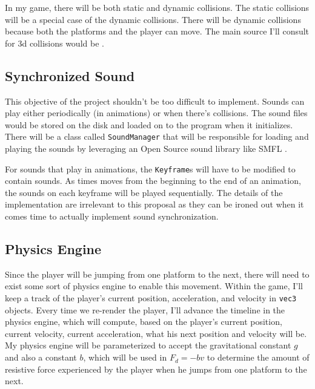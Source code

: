 \documentclass[11pt]{article}
\begin{document}
In my game, there will be both static and dynamic collisions. The static collisions will be a special case of the dynamic collisions. There will be dynamic collisions because both the platforms and the player can move. The main source I'll consult for 3d collisions would be \cite{mdn3dcd}.

\subsection*{Synchronized Sound}
This objective of the project shouldn't be too difficult to implement. Sounds can play either periodically (in animations) or when there's collisions. The sound files would be stored on the disk and loaded on to the program when it initializes. There will be a class called \verb|SoundManager| that will be responsible for loading and playing the sounds by leveraging an Open Source sound library like SMFL \cite{smfl-docs}.

For sounds that play in animations, the \verb|Keyframe|s will have to be modified to contain sounds. As times moves from the beginning to the end of an animation, the sounds on each keyframe will be played sequentially. The details of the implementation are irrelevant to this proposal as they can be ironed out when it comes time to actually implement sound synchronization.

\subsection*{Physics Engine}
Since the player will be jumping from one platform to the next, there will need to exist some sort of physics engine to enable this movement. Within the game, I'll keep a track of the player's current position, acceleration, and velocity in \verb|vec3| objects. Every time we re-render the player, I'll advance the timeline in the physics engine, which will compute, based on the player's current position, current velocity, current acceleration, what his next position and velocity will be. My physics engine will be parameterized to accept the gravitational constant $g$ and also a constant $b$, which will be used in $F_d = -bv$ to determine the amount of resistive force experienced by the player when he jumps from one platform to the next.
\end{document}
